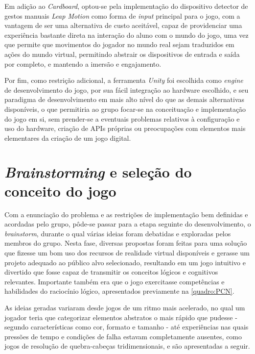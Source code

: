 Em adição ao \textit{Cardboard}, optou-se pela implementação do dispositivo 
detector de gestos manuais \textit{Leap Motion} como forma de \textit{input}
principal para o jogo, com a vantagem de ser uma alternativa de custo 
aceitável, capaz de providenciar uma experiência bastante direta na interação 
do aluno com o mundo do jogo, uma vez que permite que movimentos do jogador no 
mundo real sejam traduzidos em ações do mundo virtual, permitindo abstrair os 
dispositivos de entrada e saída por completo, e mantendo a imersão e engajamento.

Por fim, como restrição adicional, a ferramenta \textit{Unity} foi escolhida 
como \textit{engine} de desenvolvimento do jogo, por sua fácil integração 
ao hardware escolhido, e seu paradigma de desenvolvimento em mais alto nível do 
que as demais alternativas disponíveis, o que permitiria ao grupo focar-se 
na conceituação e implementação do jogo em si, sem prender-se a eventuais 
problemas relativos à configuração e uso do hardware, criação de APIs próprias 
ou preocupações com elementos mais elementares da criação de um jogo digital.

\section{\textit{Brainstorming} e seleção do conceito do jogo}\label{sec-brainstorming-conceito}

Com a enunciação do problema e as restrições de implementação bem definidas 
e acordadas pelo grupo, pôde-se passar para a etapa seguinte do desenvolvimento, 
o \textit{brainstorm}, durante o qual várias ideias foram debatidas e 
exploradas pelos membros do grupo. Nesta fase, diversas propostas foram feitas 
para uma solução que fizesse um bom uso dos recursos de realidade 
virtual disponíveis e gerasse um projeto adequado ao público alvo 
selecionado, resultando em um jogo intuitivo e divertido que fosse 
capaz de transmitir os conceitos lógicos e cognitivos relevantes.
Importante também era que o jogo exercitasse competências e 
habilidades do raciocínio lógico, apresentados previamente na 
\autoref{quadro:PCN}.

As ideias geradas variaram desde jogos de um ritmo mais acelerado, no qual 
um jogador teria que categorizar elementos abstratos o mais rápido que 
pudesse - segundo características como cor, formato e tamanho - até experiências 
nas quais pressões de tempo e condições de falha estavam completamente 
ausentes, como jogos de resolução de quebra-cabeças tridimensionais, 
e são apresentadas a seguir.

